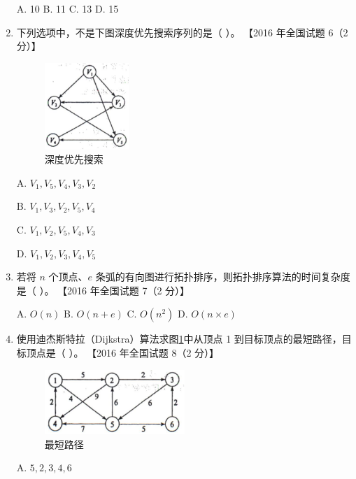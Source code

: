 \documentclass[lang=cn,newtx,10pt,scheme=chinese]{../../elegantbook}
\begin{document}
\begin{enumerate}
    A. 10 \quad B. 11 \quad C. 13 \quad D. 15  

    \item 下列选项中，不是下图深度优先搜索序列的是（ ）。  
    【2016 年全国试题 6（2 分）】  

    \begin{figure}[h!]
            \centering
            \includegraphics[width=0.3\textwidth]{../../figure/exercisePicPDF/chapter7/7-5.pdf}
            \caption{深度优先搜索}
    \end{figure}

        A. $V_1, V_5, V_4, V_3, V_2$  

        B. $V_1, V_3, V_2, V_5, V_4$  

        C. $V_1, V_2, V_5, V_4, V_3$  

        D. $V_1, V_2, V_3, V_4, V_5$  


    \item 若将 $n$ 个顶点、$e$ 条弧的有向图进行拓扑排序，则拓扑排序算法的时间复杂度是（ ）。  
    【2016 年全国试题 7（2 分）】  

    A. $O(n)$ \quad B. $O(n + e)$ \quad C. $O(n^2)$ \quad D. $O(n \times e)$  

    \item 使用迪杰斯特拉（Dijkstra）算法求图\ref{fig:7-7}中从顶点 1 到目标顶点的最短路径，目标顶点是（ ）。  
    【2016 年全国试题 8（2 分）】 
    
    \begin{figure}[h!]
            \centering
            \includegraphics[width=0.5\textwidth]{../../figure/exercisePicPDF/chapter7/7-7.pdf}
            \caption{最短路径}
            \label{fig:7-7}
    \end{figure}

        A. $5, 2, 3, 4, 6$  


\end{enumerate}
\end{document}
